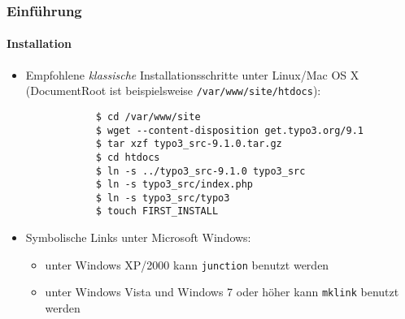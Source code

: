 \begin{frame}[fragile]
	\frametitle{Einführung}
	\framesubtitle{Installation}

	\begin{itemize}
		\item Empfohlene \textit{klassische} Installationsschritte unter Linux/Mac OS X\newline
			(DocumentRoot ist beispielsweise \texttt{/var/www/site/htdocs}):
		\begin{lstlisting}
			$ cd /var/www/site
			$ wget --content-disposition get.typo3.org/9.1
			$ tar xzf typo3_src-9.1.0.tar.gz
			$ cd htdocs
			$ ln -s ../typo3_src-9.1.0 typo3_src
			$ ln -s typo3_src/index.php
			$ ln -s typo3_src/typo3
			$ touch FIRST_INSTALL
		\end{lstlisting}

		\item Symbolische Links unter Microsoft Windows:

			\begin{itemize}
				\item unter Windows XP/2000 kann \texttt{junction} benutzt werden
				\item unter Windows Vista und Windows 7 oder höher kann \texttt{mklink} benutzt werden
			\end{itemize}

	\end{itemize}
\end{frame}

